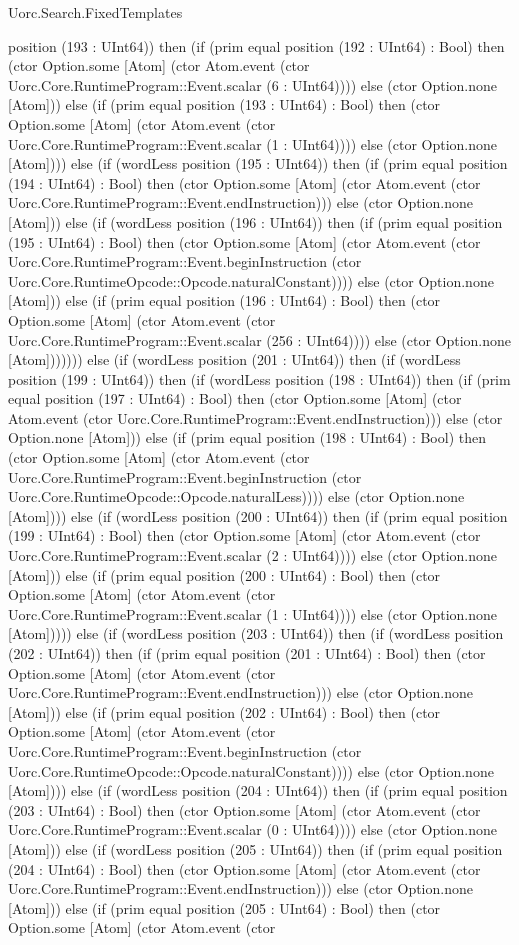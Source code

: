 \begin{lexlean}{Uorc.Search.FixedTemplates}
\begin{semanticmodule}
{position (193 : UInt64)) then (if (prim equal position (192 : UInt64) : Bool) then (ctor Option.some [Atom] (ctor Atom.event (ctor Uorc.Core.RuntimeProgram::Event.scalar (6 : UInt64)))) else (ctor Option.none [Atom])) else (if (prim equal position (193 : UInt64) : Bool) then (ctor Option.some [Atom] (ctor Atom.event (ctor Uorc.Core.RuntimeProgram::Event.scalar (1 : UInt64)))) else (ctor Option.none [Atom]))) else (if (wordLess position (195 : UInt64)) then (if (prim equal position (194 : UInt64) : Bool) then (ctor Option.some [Atom] (ctor Atom.event (ctor Uorc.Core.RuntimeProgram::Event.endInstruction))) else (ctor Option.none [Atom])) else (if (wordLess position (196 : UInt64)) then (if (prim equal position (195 : UInt64) : Bool) then (ctor Option.some [Atom] (ctor Atom.event (ctor Uorc.Core.RuntimeProgram::Event.beginInstruction (ctor Uorc.Core.RuntimeOpcode::Opcode.naturalConstant)))) else (ctor Option.none [Atom])) else (if (prim equal position (196 : UInt64) : Bool) then (ctor Option.some [Atom] (ctor Atom.event (ctor Uorc.Core.RuntimeProgram::Event.scalar (256 : UInt64)))) else (ctor Option.none [Atom])))))) else (if (wordLess position (201 : UInt64)) then (if (wordLess position (199 : UInt64)) then (if (wordLess position (198 : UInt64)) then (if (prim equal position (197 : UInt64) : Bool) then (ctor Option.some [Atom] (ctor Atom.event (ctor Uorc.Core.RuntimeProgram::Event.endInstruction))) else (ctor Option.none [Atom])) else (if (prim equal position (198 : UInt64) : Bool) then (ctor Option.some [Atom] (ctor Atom.event (ctor Uorc.Core.RuntimeProgram::Event.beginInstruction (ctor Uorc.Core.RuntimeOpcode::Opcode.naturalLess)))) else (ctor Option.none [Atom]))) else (if (wordLess position (200 : UInt64)) then (if (prim equal position (199 : UInt64) : Bool) then (ctor Option.some [Atom] (ctor Atom.event (ctor Uorc.Core.RuntimeProgram::Event.scalar (2 : UInt64)))) else (ctor Option.none [Atom])) else (if (prim equal position (200 : UInt64) : Bool) then (ctor Option.some [Atom] (ctor Atom.event (ctor Uorc.Core.RuntimeProgram::Event.scalar (1 : UInt64)))) else (ctor Option.none [Atom])))) else (if (wordLess position (203 : UInt64)) then (if (wordLess position (202 : UInt64)) then (if (prim equal position (201 : UInt64) : Bool) then (ctor Option.some [Atom] (ctor Atom.event (ctor Uorc.Core.RuntimeProgram::Event.endInstruction))) else (ctor Option.none [Atom])) else (if (prim equal position (202 : UInt64) : Bool) then (ctor Option.some [Atom] (ctor Atom.event (ctor Uorc.Core.RuntimeProgram::Event.beginInstruction (ctor Uorc.Core.RuntimeOpcode::Opcode.naturalConstant)))) else (ctor Option.none [Atom]))) else (if (wordLess position (204 : UInt64)) then (if (prim equal position (203 : UInt64) : Bool) then (ctor Option.some [Atom] (ctor Atom.event (ctor Uorc.Core.RuntimeProgram::Event.scalar (0 : UInt64)))) else (ctor Option.none [Atom])) else (if (wordLess position (205 : UInt64)) then (if (prim equal position (204 : UInt64) : Bool) then (ctor Option.some [Atom] (ctor Atom.event (ctor Uorc.Core.RuntimeProgram::Event.endInstruction))) else (ctor Option.none [Atom])) else (if (prim equal position (205 : UInt64) : Bool) then (ctor Option.some [Atom] (ctor Atom.event (ctor }
\end{semanticmodule}
\end{lexlean}

